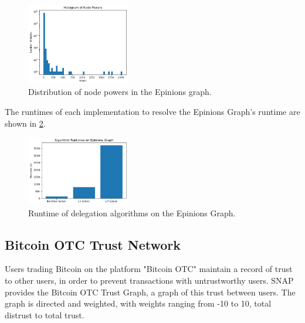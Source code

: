 \begin{figure}[h]
    \centering
    \includegraphics[width=0.4\textwidth]{epinions_power_distr}
    \caption{Distribution of node powers in the Epinions graph.}
    \label{fig:epinions_powers}
\end{figure}

The runtimes of each implementation to resolve the Epinions Graph's runtime are shown in \cref{fig:epinions_runtimes}. 

\begin{figure}[h]
    \centering
    \includegraphics[width=0.4\textwidth]{epinions_dataset}
    \caption{Runtime of delegation algorithms on the Epinions Graph.}
    \label{fig:epinions_runtimes}
\end{figure}



\subsection{Bitcoin OTC Trust Network}

Users trading Bitcoin on the platform "Bitcoin OTC" maintain a record of trust to other users, in order to prevent transactions with untrustworthy users. SNAP provides the Bitcoin OTC Trust Graph, a graph of this trust between users.  The graph is directed and weighted, with weights ranging from -10 to 10, total distrust to total trust.  

